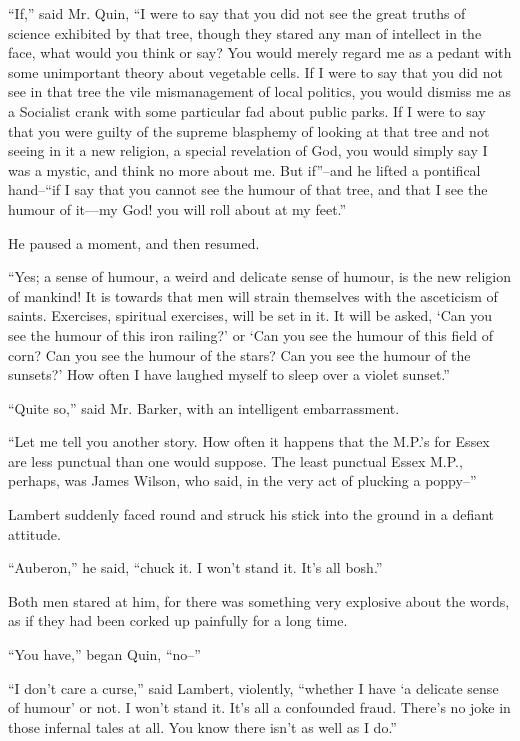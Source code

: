 \documentclass{book}
\begin{document}
“If,” said Mr. Quin, “I were to say that you did not see the great truths of science exhibited by that tree, though they stared any man of intellect in the face, what would you think or say? You would merely regard me as a pedant with some unimportant theory about vegetable cells. If I were to say that you did not see in that tree the vile mismanagement of local politics, you would dismiss me as a Socialist crank with some particular fad about public parks. If I were to say that you were guilty of the supreme blasphemy of looking at that tree and not seeing in it a new religion, a special revelation of God, you would simply say I was a mystic, and think no more about me. But if”–and he lifted a pontifical hand–“if I say that you cannot see the humour of that tree, and that I see the humour of it—my God! you will roll about at my feet.”

He paused a moment, and then resumed.

“Yes; a sense of humour, a weird and delicate sense of humour, is the new religion of mankind! It is towards that men will strain themselves with the asceticism of saints. Exercises, spiritual exercises, will be set in it. It will be asked, ‘Can you see the humour of this iron railing?’ or ‘Can you see the humour of this field of corn? Can you see the humour of the stars? Can you see the humour of the sunsets?’ How often I have laughed myself to sleep over a violet sunset.”

“Quite so,” said Mr. Barker, with an intelligent embarrassment.

“Let me tell you another story. How often it happens that the M.P.’s for Essex are less punctual than one would suppose. The least punctual Essex M.P., perhaps, was James Wilson, who said, in the very act of plucking a poppy–”

Lambert suddenly faced round and struck his stick into the ground in a defiant attitude.

“Auberon,” he said, “chuck it. I won’t stand it. It’s all bosh.”

Both men stared at him, for there was something very explosive about the words, as if they had been corked up painfully for a long time.

“You have,” began Quin, “no–”

“I don’t care a curse,” said Lambert, violently, “whether I have ‘a delicate sense of humour’ or not. I won’t stand it. It’s all a confounded fraud. There’s no joke in those infernal tales at all. You know there isn’t as well as I do.”
\end{document}
